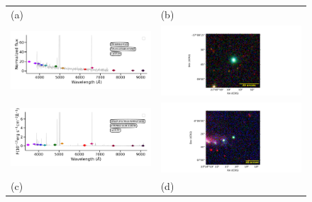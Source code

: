 \documentclass[fleqn,usenatbib]{mnras}
\begin{document}
\begin{figure}
  \setlength\tabcolsep{0pt}
  \begin{tabular}{ll}
    (a) & (b) \\
    \includegraphics[trim=10 0 10 20, clip]{Figs/StenholmAcker_pn_g006_0-41_9_id176-SPLUS-s29s46-072842.pdf} & \includegraphics[width=0.4\linewidth, trim=10 0 10 20, clip]{Figs/PNG006_316-37_100_r.pdf} \\
     \includegraphics[trim=10 0 10 20, clip]{Figs/spec-0680-52200-0153-STRIPE82-0159-019049.pdf} & \includegraphics[width=0.4\linewidth, trim=10 0 10 20, clip]{Figs/GALEX24170_351-0_150_r.pdf} \\
    (c) & (d) \\

\end{tabular}
\end{figure}
\end{document}
